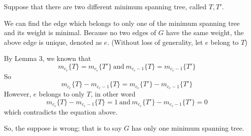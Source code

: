 Suppose that there are two different minimum spanning tree, called $T,T'$.\par

We can find the edge which belongs to only one of the minimum spanning tree and its weight is minimal.
Because no two edges of $G$ have the same weight, the above edge is unique, denoted as $e$.
(Without loss of generality, let $e$ belong to $T$)\par

By Lemma 3, we known that \[m_{c_e}\{T\} = m_{c_e}\{T'\}~\text{and}~m_{c_e - 1}\{T\} = m_{c_e - 1}\{T'\}\]
So \[m_{c_e}\{T\} -  m_{c_e - 1}\{T\} = m_{c_e}\{T'\} - m_{c_e - 1}\{T'\}\]
However, $e$ belongs to only $T$, in other word \[m_{c_e}\{T\} -  m_{c_e - 1}\{T\} = 1~\text{and}~ m_{c_e}\{T'\} - m_{c_e - 1}\{T'\} = 0\] which contradicts the equation above.\par
So, the suppose is wrong; that is to say $G$ has only one minimum spanning tree.
